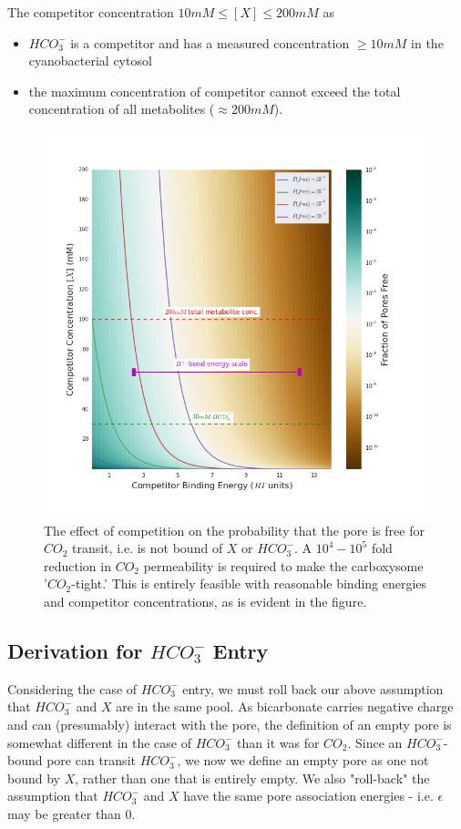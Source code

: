 \documentclass[10pt,a4paper]{article}
\begin{document}
The competitor concentration $10 mM \le [X] \le 200 mM$ as
\begin{itemize}
\item $HCO_3^-$ is a competitor and has a measured concentration $\ge 10 mM$ in the cyanobacterial cytosol
\item the maximum concentration of competitor cannot exceed the total concentration of all metabolites ($\approx 200 mM$).
\end{itemize}


\begin{figure}[ht]
\centering
\includegraphics[scale=0.6]{figures/competitive_pore_energy_v_conc.png} 
\caption{The effect of competition on the probability that the pore is free for $CO_2$ transit, i.e. is not bound of $X$ or $HCO_3^-$. A $10^4 - 10^5$ fold reduction in $CO_2$ permeability is required to make the carboxysome '$CO_2$-tight.' This is entirely feasible with reasonable binding energies and competitor concentrations, as is evident in the figure.}
\label{fig1}
\end{figure}

\subsection{Derivation for $HCO_3^-$ Entry}

Considering the case of $HCO_3^-$ entry, we must roll back our above assumption that $HCO_3^-$ and $X$ are in the same pool. As bicarbonate carries negative charge and can (presumably) interact with the pore, the definition of an empty pore is somewhat different in the case of $HCO_3^-$ than it was for $CO_2$. Since an $HCO_3^-$-bound pore can transit $HCO_3^-$, we now we define an empty pore as one not bound by $X$, rather than one that is entirely empty. We also "roll-back" the assumption that $HCO_3^-$ and $X$ have the same pore association energies - i.e. $\epsilon$ may be greater than $0$.  
\end{document}
